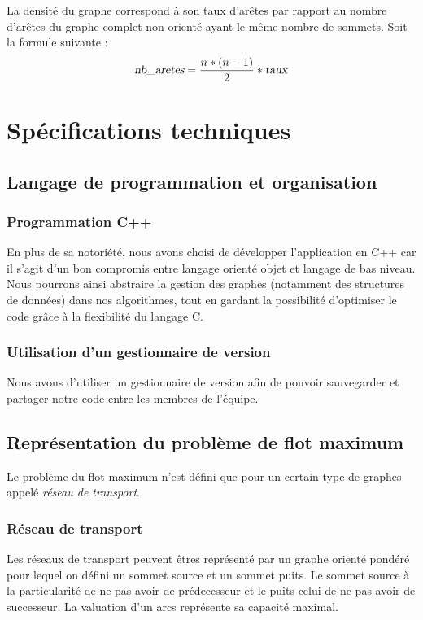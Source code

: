 La densité du graphe correspond à son taux d'arêtes par rapport au nombre d'arêtes du graphe complet non orienté ayant le même nombre de sommets. Soit la formule suivante :
\[ \textsl{nb\_aretes} = \frac{n*(n-1)}{2}*\textsl{taux}\]

\section{Spécifications techniques}

\subsection{Langage de programmation et organisation}

\subsubsection{Programmation C++}
En plus de sa notoriété, nous avons choisi de développer l'application en C++ car il s'agit d'un bon compromis entre langage orienté objet et langage de bas niveau. Nous pourrons ainsi abstraire la gestion des graphes (notamment des structures de données) dans nos algorithmes, tout en gardant la possibilité d'optimiser le code grâce à la flexibilité du langage C.

\subsubsection{Utilisation d'un gestionnaire de version}
Nous avons d'utiliser un gestionnaire de version afin de pouvoir sauvegarder et partager notre code entre les membres
de l'équipe.	

\subsection{Représentation du problème de flot maximum}

Le problème du flot maximum n'est défini que pour un certain type de graphes appelé \emph{réseau de transport}.

\subsubsection{Réseau de transport}
Les réseaux de transport peuvent êtres représenté par un graphe orienté pondéré pour lequel on défini un sommet
source et un sommet puits. Le sommet source à la particularité de ne pas avoir de prédecesseur et le puits celui
de ne pas avoir de successeur. La valuation d'un arcs représente sa capacité maximal.

